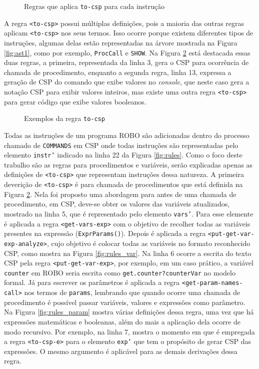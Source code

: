 \begin{figure}[h]
\centering
\caption{Regras que aplica \texttt{to-csp} para cada instrução}

\label{fig:statement}
\end{figure}

A regra \texttt{<to-csp>} possui múltiplas definições, pois a maioria das outras regras aplicam \texttt{<to-csp>} nos seus termos. Isso ocorre porque existem diferentes tipos de instruções, algumas delas estão representadas na árvore mostrada na Figura \ref{fig:ast1}, como por exemplo, \texttt{ProcCall} e \texttt{SHOW}. Na Figura \ref{fig:to_csp} está destacada essas duas regras, a primeira, representada da linha 3, gera o CSP para ocorrência de chamada de procedimento, enquanto a segunda regra, linha 13, expressa a geração de CSP do comando que exibe valores no \textit{console}, que neste caso gera a notação CSP para exibir valores inteiros, mas existe uma outra regra \texttt{<to-csp>} para gerar código que exibe valores booleanos.

\begin{figure}[h]
\centering
\caption{Exemplos da regra \texttt{to-csp}}

\label{fig:to_csp}
\end{figure}

Todas as instruções de um programa ROBO são adicionadas dentro do processo chamado de \texttt{COMMANDS} em CSP onde todas instruções são representadas pelo elemento \texttt{instr'} indicado na linha 22 da Figura \ref{fig:rules}. Como o foco deste trabalho são as regras para procedimentos e variáveis, serão explicadas apenas as definições de \texttt{<to-csp>} que representam instruções dessa natureza. A primeira deverição de \texttt{<to-csp>} é para chamada de procedimentos que está definida na Figura \ref{fig:to_csp}. Nela foi proposto uma abordagem para antes de uma chamada de procedimento, em CSP, deve-se obter os valores das variáveis atualizados, mostrado na linha 5, que é representado pelo elemento \texttt{vars'}. Para esse elemente é aplicada a regra \texttt{<get-vars-exp>} com o objetivo de recolher todas as variáveis presentes na expressão (\texttt{ExprParams()}). Depois é aplicada a regra \texttt{<put-get-var-exp-analyze>}, cujo objetivo é colocar todas as variáveis no formato reconhecido CSP, como mostra na Figura \ref{fig:rules_var}. Na linha 6 ocorre a escrita do texto CSP pela regra \texttt{<put-get-var-exp>}, por exemplo, em um caso prático, a variável \texttt{counter} em ROBO seria escrita como \texttt{get.counter?counterVar} no modelo formal. Já para escrever os parâmetros é aplicada a regra  \texttt{<get-param-names-call>} nos termos de \texttt{params}, lembrando que quando ocorre uma chamada de procedimento é possível passar variáveis, valores e expressões como parâmetro. Na Figura \ref{fig:rules_param} mostra várias definições dessa regra, uma vez que há expressões matemáticas e booleanas, além do mais a aplicação dela ocorre de modo recursivo. Por exemplo, na linha 7, mostra o momento em que é empregada a regra \texttt{<to-csp-e>} para o elemento \texttt{exp'} que tem o propósito de gerar CSP das expressões. O mesmo argumento é aplicável para as demais derivações dessa regra.


